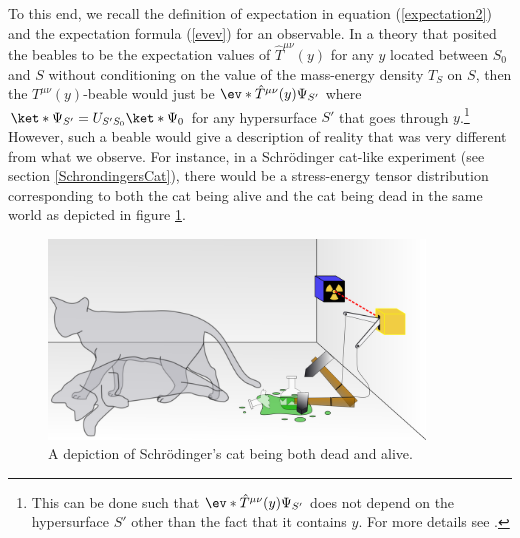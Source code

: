 \documentclass[12pt]{report}
\begin{document}
To this end, we recall the definition of expectation in equation (\ref{expectation2}) and the expectation formula (\ref{evev}) for an observable. In a theory that posited the beables to be the expectation values of $\hat{T}^{\mu\nu}(y)$ for any $y$ located between $S_0$ and $S$  without conditioning on the value of the mass-energy density $T_S$ on $S$, then the $T^{\mu\nu}(y)$-beable would just be $\ev*{\hat{T}^{\mu\nu}(y)}{\Psi_{S'}}$ where $\ket*{\Psi_{S'}}=U_{S'S_0}\ket*{\Psi_0}$ for any hypersurface $S'$ that goes through $y$.\footnote{This can be done such that $\ev*{\hat{T}^{\mu\nu}(y)}{\Psi_{S'}}$ does not depend on the hypersurface $S'$ other than the fact that it contains $y$. For more details see \cite{SchwingerJulianI}.} However, such a beable would give a description of reality that was very different from what we observe. For instance, in a Schr\"{o}dinger cat-like experiment (see section \ref{SchrondingersCat}), there would be a stress-energy tensor distribution corresponding to both the cat being alive and the cat being dead in the same world as depicted in figure \ref{deadlivecat2}.
\begin{figure}[ht!]
  \captionsetup{justification=justified}
  \centering
  \includegraphics[width=100mm]{Chapter03/Schrodingers_cat.png}
  \caption[Depiction of Schr\"{o}dinger's cat]{A depiction of Schr\"{o}dinger's cat being both dead and alive.\protect\footnotemark}
  \label{deadlivecat2}
  \end{figure}
\end{document}
